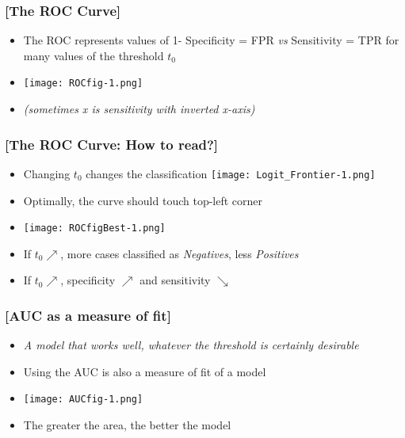 \documentclass[xcolor=x11names,compress, handhouts]{beamer}
\renewcommand{\(}{\begin{columns}}
\renewcommand{\)}{\end{columns}}
\newcommand{\<}[1]{\begin{column}{#1}}
\renewcommand{\>}{\end{column}}
\begin{document}
\begin{frame} %
\frametitle{\textcolor{brique}{[The ROC Curve]}}
\pause
 \begin{itemize}[<+->]
  \item[] The ROC represents values of 1- Specificity =  FPR  \textit{vs} Sensitivity =  TPR for many values of the threshold $t_0$
  \item[] \begin{center}\texttt{[image: ROCfig-1.png]} \end{center}
  \item \textit{(sometimes  x is sensitivity  with inverted x-axis)}
\end{itemize}
\end{frame}

\begin{frame} %
\frametitle{\textcolor{brique}{[The ROC Curve: How to read?]}}
\pause
 \begin{itemize}[<+->]
  \item[] Changing $t_0$ changes the classification \hfill \texttt{[image: Logit\_Frontier-1.png]}
  \item  Optimally, the curve should touch top-left corner
  \item[] \begin{center}\texttt{[image: ROCfigBest-1.png]} \end{center}
  \item If $t_0  \nearrow $,  more cases  classified as \textit{Negatives}, less \textit{Positives}
  \item If $t_0  \nearrow $,   specificity  $\nearrow $ and sensitivity $\searrow$
\end{itemize}
\end{frame}


\begin{frame} %
\frametitle{\textcolor{brique}{[AUC as a measure of fit]}}
\pause
 \begin{itemize}[<+->]
  \item[] \emph{A model that works well, whatever the threshold is certainly desirable}
  \item  Using the AUC  is also a measure of fit of a model
  \item[] \begin{center}\texttt{[image: AUCfig-1.png]} \end{center}
  \item The greater the area, the better the model
\end{itemize}
\end{frame}
\end{document}
